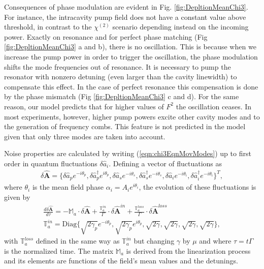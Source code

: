 \documentclass[aps,prl,twocolumn,groupedaddress]{revtex4-1}
\begin{document}
Consequences of phase modulation are evident in Fig. \ref{fig:DepltionMeanChi3}. For instance, the intracavity pump field does not have a constant value above threshold, in contrast to the $\chi^{(2)}$ scenario \cite{Debuisschert1993,Fabre1997} depending instead on the incoming power. Exactly on resonance and for perfect phase matching (Fig \ref{fig:DepltionMeanChi3} a and b), there is no oscillation. This is because when we increase the pump power in order to trigger the oscillation, the phase modulation shifts the mode frequencies out of resonance. It is necessary to pump the resonator with nonzero detuning (even larger than the cavity linewidth) to compensate this effect. In the case of perfect resonance this compensation is done by the phase mismatch (Fig \ref{fig:DepltionMeanChi3} c and d). For the same reason, our model predicts that for higher values of $F^2$ the oscillation ceases. In most experiments, however, higher pump powers excite other cavity modes and to the generation of frequency combs. This feature is not predicted in the model given that only three modes are taken into account.

Noise properties are calculated by writing (\ref{eqn:chi3EqnMovModes}) up to first order in quantum fluctuations $\delta\hat{a}_i$. Defining a vector of fluctuations as 
\begin{eqnarray*}
	\delta\mathbf{{\hat{{A}}}}=\{\delta \hat{a}_p e^{-i\theta_p},\delta \hat{a}_p^{\dagger}e^{i\theta_p},\delta \hat{a}_se^{-i\theta_s},\delta \hat{a}_s^\dagger e^{-i\theta_s},\delta \hat{a}_ie^{-i\theta_i},\delta \hat{a}_i^\dagger e^{-i\theta_i}\}^T,
\end{eqnarray*} 
where $\theta_i$ is the mean field phase $\alpha_i=A_ie^{i\theta_i}$, the evolution of these fluctuations is given by
\begin{gather}
\frac{d \delta\hat{\mathbf{A}}}{d\tau}=-\mathbb{M}_a\cdot\delta\hat{\mathbf{A}}+\frac{\mathbb{T}_a^{in}}{\Gamma}\cdot\delta\hat{\mathbf{A}}^{in}+\frac{\mathbb{T}_a^{loss}}{\Gamma}\cdot\delta\hat{\mathbf{A}}^{loss}\label{eqn:MotiondA}\\
\mathbb{T}_a^{in}=\text{Diag}\{\sqrt{2\gamma_p}e^{-i\theta_p},\sqrt{2\gamma_p}e^{i\theta_p},\sqrt{2\gamma},\sqrt{2\gamma},\sqrt{2\gamma},\sqrt{2\gamma}\},\nonumber 
\end{gather}
with $\mathbb{T}_a^{loss}$ defined in the same way as $\mathbb{T}_a^{in}$ but changing $\gamma$ by $\mu$ and where $\tau=t\Gamma$ is the normalized time. The matrix $\mathbb{M}_a$ is derived from the linearization process and its elements are functions of the field's mean values and the detunings.
\end{document}
